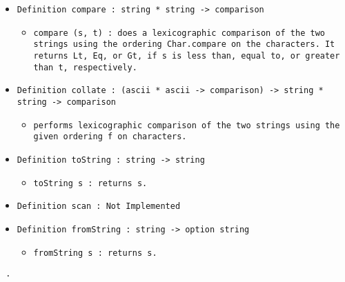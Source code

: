 \documentclass[11pt]{report}
\begin{document}
\begin{itemize}
\begin{itemize}
\end{itemize}

\item \texttt{Definition compare : string * string -> comparison}
    
\begin{itemize}
\item \begin{flushleft} \texttt{compare (s, t) : does a lexicographic comparison of the two strings using the ordering Char.compare on the characters. It returns Lt, Eq, or Gt, if s is less than, equal to, or greater than t, respectively.} \end{flushleft}
\end{itemize}    
    

\item \begin{flushleft}\texttt{Definition collate : (ascii * ascii -> comparison) -> string * string -> comparison}\end{flushleft}

\begin{itemize}
\item \begin{flushleft} \texttt{performs lexicographic comparison of the two strings using the given ordering f on characters.}\end{flushleft}
\end{itemize}
    
\item \texttt{Definition toString : string -> string}

\begin{itemize}
\item \texttt{toString s : returns s.}
\end{itemize}
  
\item \texttt{Definition scan : Not Implemented}

\item \texttt{Definition fromString : string -> option string}

\begin{itemize}
\item \texttt{fromString s : returns s.}
\end{itemize}    
       

 
    
    
    
\end{itemize}
\begin{coqdoccode}
\coqdocemptyline
\coqdocemptyline
\coqdocnoindent
\texttt{ .\coqdoceol}
\coqdocemptyline
\end{coqdoccode}
\end{document}
